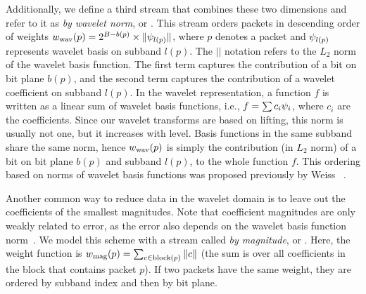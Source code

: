 Additionally, we define a third stream that combines these two dimensions and refer to it as
\emph{by wavelet norm}, or \swav. This stream orders packets in descending order of weights
$\wwav(p)=2^{B-b(p)}\times \| \wbas_{l(p)} \|$, where $p$ denotes a packet and $\wbas_{l(p)}$
represents wavelet basis on subband $l(p)$. The $||$ notation refers to the $L_2$ norm of the
wavelet basis function. The first term captures the contribution of a bit on bit plane $b(p)$, and
the second term captures the contribution of a wavelet coefficient on subband $l(p)$.
%
%
In the wavelet representation, a function $f$ is written as a linear sum of wavelet basis functions,
i.e., $f=\sum{c_i\wbas_i}$, where $c_i$ are the coefficients. Since our wavelet transforms are based
on lifting, this norm is usually not one, but it increases with level. Basis functions in the same
subband share the same norm, hence $\wwav(p)$ is simply the contribution (in $L_2$ norm) of a bit on
bit plane $b(p)$ and subband $l(p)$, to the whole function $f$. This ordering based on norms of
wavelet basis functions was proposed previously by Weiss \etal~\cite{weiss}.

Another common way to reduce data in the wavelet domain is to leave out the coefficients of the
smallest magnitudes. Note that coefficient magnitudes are only weakly related to error, as the error
also depends on the wavelet basis function norm~\cite{weiss}. We model this scheme with a stream
called \emph{by magnitude}, or \smag. Here, the weight function is $\wmag(p)=\sum_{c\in
\text{block}(p)}\norm{c}$ (the sum is over all coefficients in the block that contains packet $p$).
If two packets have the same weight, they are ordered by subband index and then by bit plane.

